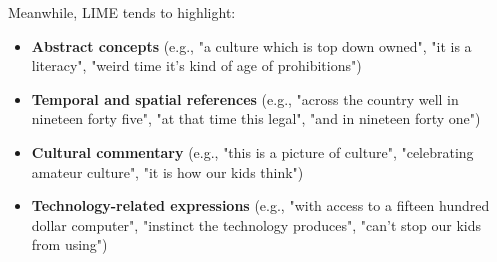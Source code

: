 \documentclass[10pt,letterpaper]{article}
\begin{document}
Meanwhile, LIME tends to highlight:
\begin{itemize}
    \item \textbf{Abstract concepts} (e.g., "a culture which is top down owned", "it is a literacy", "weird time it's kind of age of prohibitions")
    \item \textbf{Temporal and spatial references} (e.g., "across the country well in nineteen forty five", "at that time this legal", "and in nineteen forty one")
    \item \textbf{Cultural commentary} (e.g., "this is a picture of culture", "celebrating amateur culture", "it is how our kids think")
    \item \textbf{Technology-related expressions} (e.g., "with access to a fifteen hundred dollar computer", "instinct the technology produces", "can't stop our kids from using")
\end{itemize}
\end{document}
